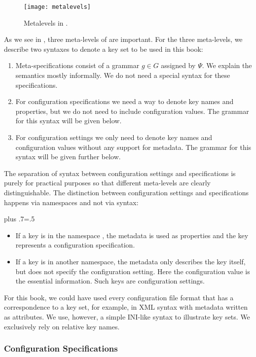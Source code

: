 \begin{figure}[htp]
\centering
\texttt{[image: metalevels]}
\caption{Metalevels in \elektra{}.}
\label{fig:metalevels}
\end{figure}

As we see in , three meta-levels of \elektra{} are important.
For the three meta-levels, we describe two syntaxes to denote a key set to be used in this book:
\begin{enumerate}
\item
Meta-specifications consist of a grammar $g \in G$ assigned by $\Psi$.
We explain the semantics mostly informally.
We do not need a special syntax for these specifications.
\item
For configuration specifications we need a way to denote key names and properties, but we do not need to include configuration values.
The grammar for this syntax will be given below.
\item
For configuration settings we only need to denote key names and configuration values without any support for metadata.
The grammar for this syntax will be given further below.
\end{enumerate}
The separation of syntax between configuration settings and specifications is purely for practical purposes so that different meta-levels are clearly distinguishable.
The distinction between configuration settings and specifications happens via namespaces and not via syntax:%
{\parfillskip=0pt plus .7\textwidth \emergencystretch=.5\textwidth \par}
\begin{itemize}
\item
If a key is in the namespace , the metadata is used as properties and the key represents a configuration specification.
\item
If a key is in another namespace, the metadata only describes the key itself, but does not specify the configuration setting.
Here the configuration value is the essential information.
Such keys are configuration settings.
\end{itemize}

For this book, we could have used every configuration file format that has a correspondence to a key set, for example, in XML syntax with metadata written as attributes.
We use, however, a simple INI-like syntax to illustrate key sets.
We exclusively rely on relative key names.

\subsubsection{Configuration Specifications}
\label{sec:syntax-spec}


